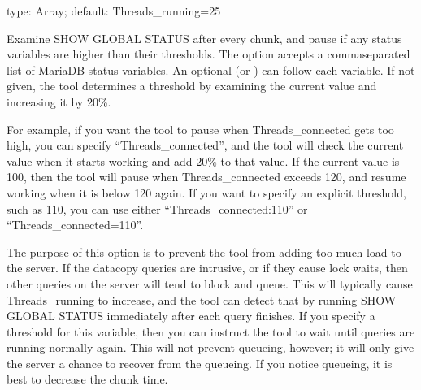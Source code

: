 \documentclass[letterpaper,10pt,english]{sphinxmanual}
\begin{document}

\begin{fulllineitems}
\label{\detokenize{mariadb-schema-change:cmdoption-mariadb-schema-change-max-load}}
type: Array; default: Threads\_running=25

Examine SHOW GLOBAL STATUS after every chunk, and pause if any status variables
are higher than their thresholds.  The option accepts a comma\sphinxhyphen{}separated list of
MariaDB status variables.  An optional  (or ) can follow
each variable.  If not given, the tool determines a threshold by examining the
current value and increasing it by 20\%.

For example, if you want the tool to pause when Threads\_connected gets too high,
you can specify “Threads\_connected”, and the tool will check the current value
when it starts working and add 20\% to that value.  If the current value is 100,
then the tool will pause when Threads\_connected exceeds 120, and resume working
when it is below 120 again.  If you want to specify an explicit threshold, such
as 110, you can use either “Threads\_connected:110” or “Threads\_connected=110”.

The purpose of this option is to prevent the tool from adding too much load to
the server. If the data\sphinxhyphen{}copy queries are intrusive, or if they cause lock waits,
then other queries on the server will tend to block and queue. This will
typically cause Threads\_running to increase, and the tool can detect that by
running SHOW GLOBAL STATUS immediately after each query finishes.  If you
specify a threshold for this variable, then you can instruct the tool to wait
until queries are running normally again.  This will not prevent queueing,
however; it will only give the server a chance to recover from the queueing.  If
you notice queueing, it is best to decrease the chunk time.

\end{fulllineitems}
\end{document}
